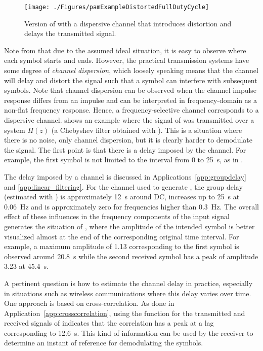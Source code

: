 \begin{figure}[htbp]
\centering
\texttt{[image: ./Figures/pamExampleDistortedFullDutyCycle]}
\caption{Version of  with a dispersive channel that introduces distortion and delays the transmitted signal.\label{fig:pamExampleDistortedFullDutyCycle}}
\end{figure}

Note from  that due to the assumed ideal situation, it is easy to observe where each symbol starts and ends. However, the practical transmission systems have some degree of \emph{channel dispersion}, which loosely speaking means that the channel will delay and distort the signal such that a symbol can interfere with subsequent symbols. Note that channel dispersion can be observed when the channel impulse response differs from an impulse and can be interpreted in frequency-domain as a non-flat frequency response. Hence, a frequency-selective channel corresponds to a dispersive channel.  shows an example where the signal of  was transmitted over a system $H(z)$ (a Chebyshev filter obtained with ). This is a situation where there is no noise, only channel dispersion, but it is clearly harder to demodulate the signal. The first point is that there is a delay imposed by the channel. For example, the first symbol is not limited to the interval from 0 to 25~s, as in . 

The delay imposed by a channel is discussed in Applications~\ref{app:groupdelay} and \ref{app:linear_filtering}. For the channel used to generate , the group delay (estimated with ) is approximately 12~s around DC, increases up to 25~s at 0.06~Hz and is approximately zero for frequencies higher than 0.3~Hz. The overall effect of these influences in the frequency components of the input signal generates the situation of , where the amplitude of the intended symbol is better visualized almost at the end of the corresponding original time interval. For example, a maximum amplitude of 1.13 corresponding to the first symbol is observed around 20.8~s while the second received symbol has a peak of amplitude 3.23 at 45.4~s.

A pertinent question is how to estimate the channel delay in practice, especially in situations such as wireless communications where this delay varies over time. One approach is based on cross-correlation. As done in Application~\ref{app:crosscorrelation}, using the function  for the transmitted and received signals of  indicates that the correlation has a peak at a lag corresponding to 12.6~s. This kind of information can be used by the receiver to determine an instant of reference for demodulating the symbols.

